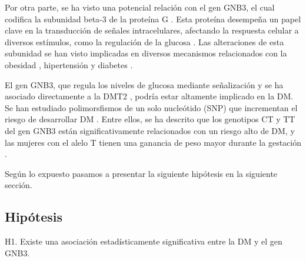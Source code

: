 Por otra parte, se ha visto una potencial relación con el gen GNB3, el cual codifica la subunidad beta-3 de la proteína G \cite{Feng2019}. Esta proteína desempeña un papel clave en la transducción de señales intracelulares, afectando la respuesta celular a diversos estímulos, como la regulación de la glucosa \cite{Neves2002}. Las alteraciones de esta subunidad se han visto implicadas en diversos mecanismos relacionados con la obesidad \cite{Hsiao2013}, hipertensión y diabetes \cite{Siffert2005}.
 
El gen GNB3, que regula los niveles de glucosa mediante señalización y se ha asociado directamente a la DMT2 \cite{Rizvi2016}, podría estar altamente implicado en la DM. Se han estudiado polimorsfismos de un solo nucleótido (SNP) que incrementan el riesgo de desarrollar DM \cite{ortega}. Entre ellos, se ha descrito que los genotipos CT y TT  del gen GNB3 están significativamente relacionados con un riesgo alto de DM, y las mujeres con el alelo T tienen una ganancia de peso mayor durante la gestación \cite{ortega}. 


Según lo expuesto pasamos a presentar la siguiente hipótesis en la siguiente sección.

\subsection{Hipótesis}

H1. Existe una asociación estadísticamente significativa entre la DM y el gen GNB3.